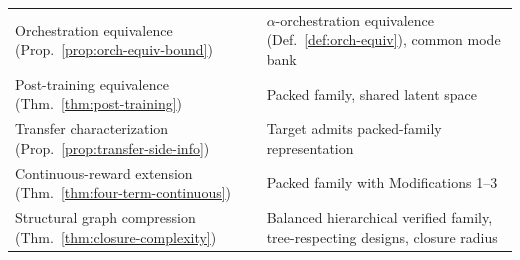 \documentclass[10pt]{article}
\theoremstyle{paperplain}
\theoremstyle{paperdefinition}
\theoremstyle{paperremark}
\begin{document}
\begin{center}
\begin{tabular}{@{}lp{7cm}@{}}
Orchestration equivalence (Prop.~\ref{prop:orch-equiv-bound}) & $\alpha$-orchestration equivalence (Def.~\ref{def:orch-equiv}), common mode bank \\
Post-training equivalence (Thm.~\ref{thm:post-training}) & Packed family, shared latent space \\
Transfer characterization (Prop.~\ref{prop:transfer-side-info}) & Target admits packed-family representation \\
Continuous-reward extension (Thm.~\ref{thm:four-term-continuous}) & Packed family with Modifications 1--3 \\
Structural graph compression (Thm.~\ref{thm:closure-complexity}) & Balanced hierarchical verified family, tree-respecting designs, closure radius \\
\bottomrule
\end{tabular}
\end{center}
\end{document}
